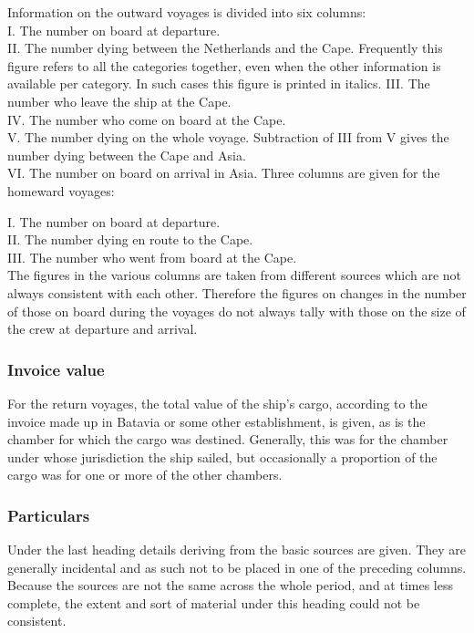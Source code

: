\documentclass[10pt,twocolumn,fleqn]{article}
\begin{document}
Information on the outward voyages is divided into six columns:\\
I. The number on board at departure.\\
II. The number dying between the Netherlands and the Cape. Frequently this
figure refers to all the categories together, even when the other information
is available per category. In such cases this figure is printed in italics.
III. The number who leave the ship at the Cape.\\
IV. The number who come on board at the Cape.\\
V. The number dying on the whole voyage. Subtraction of III from V gives the
number dying between the Cape and Asia.\\
VI. The number on board on arrival in Asia. Three columns are given for the homeward voyages:

I. The number on board at departure.\\
II. The number dying en route to the Cape.\\
III. The number who went from board at the Cape.\\

The figures in the various columns are taken from different sources which 
are not always consistent with each other. Therefore the figures on changes in 
the number of those on board during the voyages do not always tally with 
those on the size of the crew at departure and arrival.

\subsubsection*{Invoice value}
For the return voyages, the total value of the ship's cargo, according to the 
invoice made up in Batavia or some other establishment, is given, as is the 
chamber for which the cargo was destined. Generally, this was for the chamber 
under whose jurisdiction the ship sailed, but occasionally a proportion of 
the cargo was for one or more of the other chambers.

\subsubsection*{Particulars}
Under the last heading details deriving from the basic sources are given. 
They are generally incidental and as such not to be placed in one of the 
preceding columns. Because the sources are not the same across the whole 
period, and at times less complete, the extent and sort of material under 
this heading could not be consistent.
\end{document}
